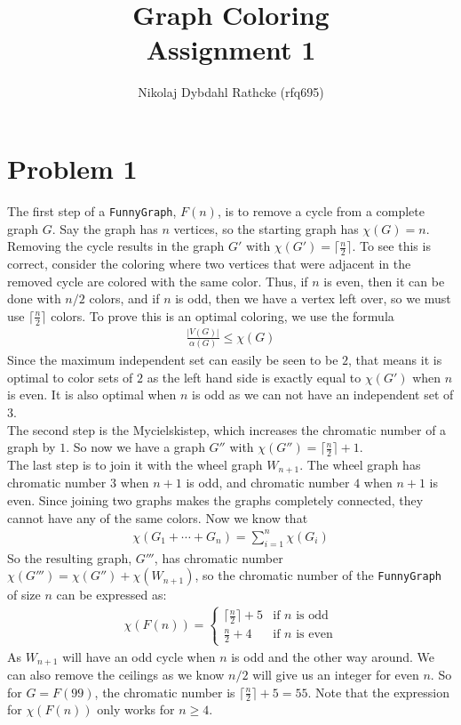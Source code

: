 \documentclass[a4paper]{article}
\author{Nikolaj Dybdahl Rathcke (rfq695)}
\title{Graph Coloring \\ Assignment 1}
\begin{document}
\maketitle

\section{Problem 1}
The first step of a \texttt{FunnyGraph}, $F(n)$, is to remove a cycle from a complete graph $G$. Say the graph has $n$ vertices, so the starting graph has $\chi(G)=n$. Removing the cycle results in the graph $G'$ with $\chi(G')=\lceil \frac{n}{2} \rceil$. To see this is correct, consider the coloring where two vertices that were adjacent in the removed cycle are colored with the same color. Thus, if $n$ is even, then it can be done with $n/2$ colors, and if $n$ is odd, then we have a vertex left over, so we must use $\lceil \frac{n}{2} \rceil$ colors. To prove this is an optimal coloring, we use the formula
\begin{align*}
  \frac{|V(G)|}{\alpha (G)}\leq \chi(G)
\end{align*}
Since the maximum independent set can easily be seen to be $2$, that means it is optimal to color sets of $2$ as the left hand side is exactly equal to $\chi(G')$ when $n$ is even. It is also optimal when $n$ is odd as we can not have an independent set of $3$. \\
The second step is the Mycielskistep, which increases the chromatic number of a graph by $1$. So now we have a graph $G''$ with $\chi(G'')=\lceil \frac{n}{2} \rceil+1$. \\
The last step is to join it with the wheel graph $W_{n+1}$. The wheel graph has chromatic number $3$ when $n+1$ is odd, and chromatic number $4$ when $n+1$ is even. Since joining two graphs makes the graphs completely connected, they cannot have any of the same colors. Now we know that
\begin{align*}
  \chi(G_1+\cdots +G_n)=\sum_{i=1}^n \chi(G_i)
\end{align*}
So the resulting graph, $G'''$, has chromatic number $\chi(G''')=\chi(G'')+\chi(W_{n+1})$, so the chromatic number of the \texttt{FunnyGraph} of size $n$ can be expressed as:
\begin{align*}
  \chi(F(n)) =
  \begin{cases} \lceil \frac{n}{2} \rceil + 5 & \text{if $n$ is odd} \\
                \frac{n}{2} + 4               & \text{if $n$ is even}
  \end{cases}
\end{align*}
As $W_{n+1}$ will have an odd cycle when $n$ is odd and the other way around. We can also remove the ceilings as we know $n/2$ will give us an integer for even $n$. So for $G=F(99)$, the chromatic number is $\lceil \frac{n}{2} \rceil + 5=55$. Note that the expression for $\chi(F(n))$ only works for $n\geq 4$.
\end{document}
